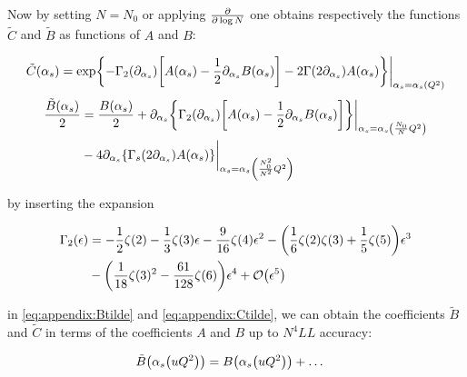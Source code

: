 \documentclass[../main.tex]{subfiles}
\begin{document}
Now by setting $N=N_0$ or applying $\pdv{\log N}$ one obtains respectively the functions $\tilde{C}$ and  $\tilde{B}$ as functions of $A$ and $B$:

\begin{equation}\label{eq:appendix:Ctilde}
    \tilde{C}(\alpha_s) = \exp{-\Gamma_2(\partial_{\alpha_s}) \qty[A(\alpha_s)-\frac{1}{2} \partial_{\alpha_s}B(\alpha_s)]- 2 \Gamma\qty(2\partial_{\alpha_s}) A(\alpha_s)}\biggr\rvert_{\alpha_s=\alpha_s\qty(Q^2)} 
\end{equation}
\begin{equation}\label{eq:appendix:Btilde}
    \begin{split}
    \frac{\tilde{B}(\alpha_s)}{2} &= \frac{B(\alpha_s)}{2} + \partial_{\alpha_s} \qty{\Gamma_2(\partial_{\alpha_s}) \qty[A(\alpha_s)-\frac{1}{2} \partial_{\alpha_s}B(\alpha_s)]} \biggr \rvert_{\alpha_s = \alpha_s\qty(\frac{N_0}{N}Q^2)}\\
    &- 4 \partial_{\alpha_s} \qty{\Gamma_s\qty(2\partial_{\alpha_s}) A(\alpha_s)}\biggr\rvert_{\alpha_s=\alpha_s\qty(\frac{N_0^2}{N^2}Q^2)} 
\end{split}
\end{equation}

by inserting the expansion 

\begin{align}
    \begin{split}
    \Gamma_2(\epsilon) &= -\frac{1}{2}\zeta(2) -\frac{1}{3}\zeta(3) \epsilon - \frac{9}{16}\zeta(4) \epsilon^2 - \qty(\frac{1}{6}\zeta(2)\zeta(3)+ \frac{1}{5}\zeta(5))\epsilon^3 \\
    &- \qty(\frac{1}{18}\zeta(3)^2 - \frac{61}{128}\zeta(6))\epsilon^4 + \order{\epsilon^5}   
    \end{split}
\end{align}

in \cref{eq:appendix:Btilde} and \cref{eq:appendix:Ctilde}, we can obtain the coefficients $\tilde{B}$ and $\tilde{C}$ in terms of the coefficients $A$ and $B$ up to $N^4LL$ accuracy: 

\begin{align}
    \begin{split}
    \tilde{B}\qty(\alpha_s \qty(u Q^2)) &= B\qty(\alpha_s \qty(u Q^2))  + \dots
    \end{split}
\end{align}
\end{document}
